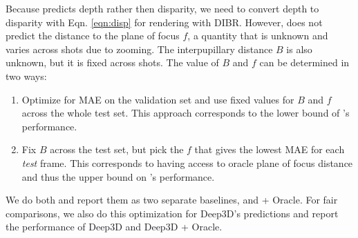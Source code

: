 \documentclass[runningheads]{llncs}
\begin{document}
Because \cite{eigen2014depth} predicts depth rather then disparity, we need to convert depth to disparity with Eqn. \ref{eqn:disp} for rendering with DIBR.
However, \cite{eigen2014depth} does not predict the distance to the plane of focus $f$, a quantity that is unknown and varies across shots due to zooming.
The interpupillary distance $B$ is also unknown, but it is fixed across shots.
The value of $B$ and $f$ can be determined in two ways:
\begin{enumerate}
\item Optimize for MAE on the validation set and use fixed values for $B$ and $f$ across the whole test set.
This approach corresponds to the lower bound of \cite{eigen2014depth}'s performance.
\item Fix $B$ across the test set, but pick the $f$ that gives the lowest MAE for each \emph{test} frame.
This corresponds to having access to oracle plane of focus distance and thus the upper bound on \cite{eigen2014depth}'s performance.
\end{enumerate}

We do both and report them as two separate baselines, \cite{eigen2014depth} and \cite{eigen2014depth} + Oracle.
For fair comparisons, we also do this optimization for Deep3D's predictions and report the performance of Deep3D and Deep3D + Oracle.
\end{document}
